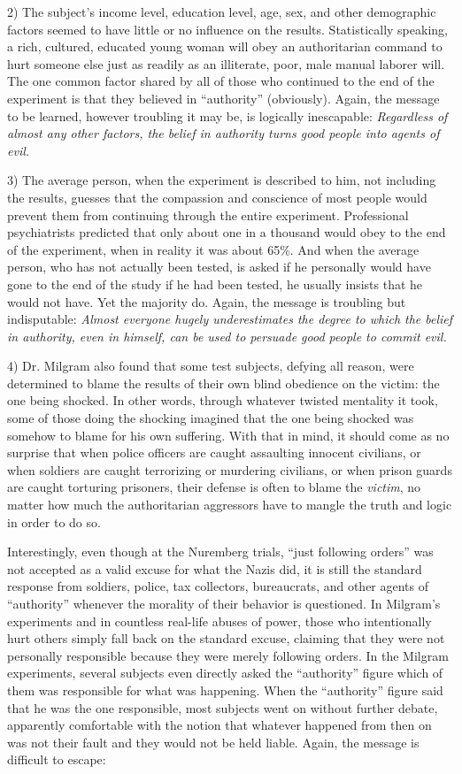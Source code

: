 \documentclass{book}
\begin{document}
2) The subject's income level, education level, age, sex, and other demographic factors seemed to have little or no influence on the results. Statistically speaking, a rich, cultured, educated young woman will obey an authoritarian command to hurt someone else just as readily as an illiterate, poor, male manual laborer will. The one common factor shared by all of those who continued to the end of the experiment is that they believed in \enquote{authority} (obviously). Again, the message to be learned, however troubling it may be, is logically inescapable: \emph{Regardless of almost any other factors, the belief in authority turns good people into agents of evil.}

3) The average person, when the experiment is described to him, not including the results, guesses that the compassion and conscience of most people would prevent them from continuing through the entire experiment. Professional psychiatrists predicted that only about one in a thousand would obey to the end of the experiment, when in reality it was about 65\%. And when the average person, who has not actually been tested, is asked if he personally would have gone to the end of the study if he had been tested, he usually insists that he would not have. Yet the majority do. Again, the message is troubling but indisputable: \emph{Almost everyone hugely underestimates the degree to which the belief in authority, even in himself, can be used to persuade good people to commit evil.}

4) Dr. Milgram also found that some test subjects, defying all reason, were determined to blame the results of their own blind obedience on the victim: the one being shocked. In other words, through whatever twisted mentality it took, some of those doing the shocking imagined that the one being shocked was somehow to blame for his own suffering. With that in mind, it should come as no surprise that when police officers are caught assaulting innocent civilians, or when soldiers are caught terrorizing or murdering civilians, or when prison guards are caught torturing prisoners, their defense is often to blame the \emph{victim}, no matter how much the authoritarian aggressors have to mangle the truth and logic in order to do so.

Interestingly, even though at the Nuremberg trials, \enquote{just following orders} was not accepted as a valid excuse for what the Nazis did, it is still the standard response from soldiers, police, tax collectors, bureaucrats, and other agents of \enquote{authority} whenever the morality of their behavior is questioned. In Milgram's experiments and in countless real-life abuses of power, those who intentionally hurt others simply fall back on the standard excuse, claiming that they were not personally responsible because they were merely following orders. In the Milgram experiments, several subjects even directly asked the \enquote{authority} figure which of them was responsible for what was happening. When the \enquote{authority} figure said that he was the one responsible, most subjects went on without further debate, apparently comfortable with the notion that whatever happened from then on was not their fault and they would not be held liable. Again, the message is difficult to escape:
\end{document}
